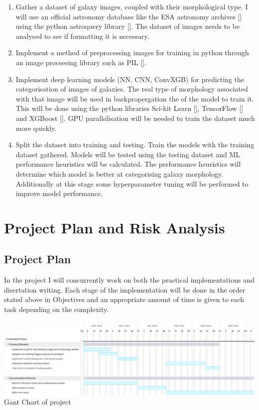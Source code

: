 \documentclass[runningheads]{llncs}
\begin{document}
\begin{enumerate}
    \item Gather a dataset of galaxy images, coupled with their morphological
    type. I will use an official astronomy database like the ESA astronomy
    archives [] using the python astroquery library []. The dataset of images
    needs to be analysed to see if formatting it is necessary.

    \item Implement a method of preprocessing images for training in python
    through an image procseeing library such as PIL [].

    \item Implement deep learning models (NN, CNN, ConvXGB) for predicting
    the categorisation of images of galaxies. The real type of morphology
    associated with that image will be used in backpropergation the of the model
    to train it. This will be done using the python libraries Sci-kit Learn [],
    TensorFlow [] and XGBoost []. GPU parallelisation will be needed to train
    the dataset much more quickly.

    \item Split the dataset into training and testing. Train the models with the
    training dataset gathered. Models will be tested using the testing dataset
    and ML performance heuristics will be calculated. The performance heuristics
    will determine which model is better at categorising galaxy morphology.
    Additionally at this stage some hyperparameter tuning will be performed to
    improve model performance.
\end{enumerate}

\section{Project Plan and Risk Analysis}

\subsection{Project Plan}

In the project I will concurrently work on both the practical implementations
and disertation writing. Each stage of the implementation will be done in the
order stated above in Objectives and an appropriate amount of time is given to
each task depending on the complexity.

\includegraphics[width=\textwidth]{GantChart.png}
Gant Chart of project
\end{document}
